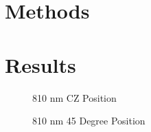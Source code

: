 \documentclass[journal,twoside,web]{ieeecolor}
\begin{document}
\section{Methods}
\label{sec:methods}

\section{Results}
\label{sec:results}

\begin{figure}[!htb]
    \caption{\label{fig:810-CZ} 810 nm CZ Position}
\end{figure}

\begin{figure}[!htb]
    \caption{\label{fig:810-45} 810 nm 45 Degree Position}
\end{figure}
\end{document}
